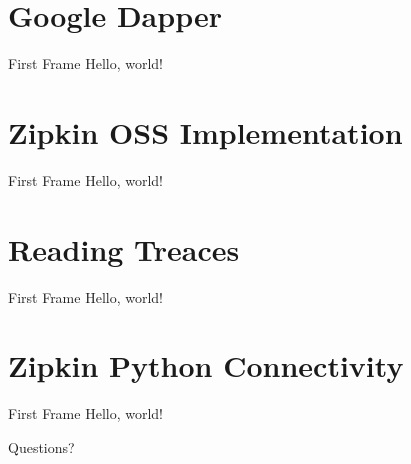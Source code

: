 \documentclass[12pt]{beamer}
\begin{document}
  \section{Google Dapper}
  \begin{frame}{First Frame}
    Hello, world!
  \end{frame}
  \section{Zipkin OSS Implementation}
  \begin{frame}{First Frame}
    Hello, world!
  \end{frame}
  \section{Reading Treaces}
  \begin{frame}{First Frame}
    Hello, world!
  \end{frame}
  \section{Zipkin Python Connectivity}
  \begin{frame}{First Frame}
    Hello, world!
  \end{frame}
\begin{frame}[standout]
  Questions?
\end{frame}
\end{document}
